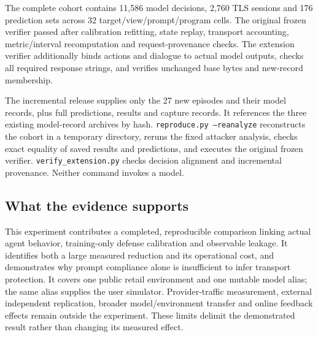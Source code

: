 \documentclass[10pt,letterpaper]{article}
\begin{document}
The complete cohort contains 11,586 model decisions, 2,760 TLS sessions and 176 prediction sets across 32 target/view/prompt/program cells. The original frozen verifier passed after calibration refitting, state replay, transport accounting, metric/interval recomputation and request-provenance checks. The extension verifier additionally binds actions and dialogue to actual model outputs, checks all required response strings, and verifies unchanged base bytes and new-record membership.

The incremental release supplies only the 27 new episodes and their model records, plus full predictions, results and capture records. It references the three existing model-record archives by hash. \texttt{reproduce.py --reanalyze} reconstructs the cohort in a temporary directory, reruns the fixed attacker analysis, checks exact equality of saved results and predictions, and executes the original frozen verifier. \texttt{verify\_extension.py} checks decision alignment and incremental provenance. Neither command invokes a model.

\subsection*{What the evidence supports}
This experiment contributes a completed, reproducible comparison linking actual agent behavior, training-only defense calibration and observable leakage. It identifies both a large measured reduction and its operational cost, and demonstrates why prompt compliance alone is insufficient to infer transport protection. It covers one public retail environment and one mutable model alias; the same alias supplies the user simulator. Provider-traffic measurement, external independent replication, broader model/environment transfer and online feedback effects remain outside the experiment. These limits delimit the demonstrated result rather than changing its measured effect.
\end{document}

